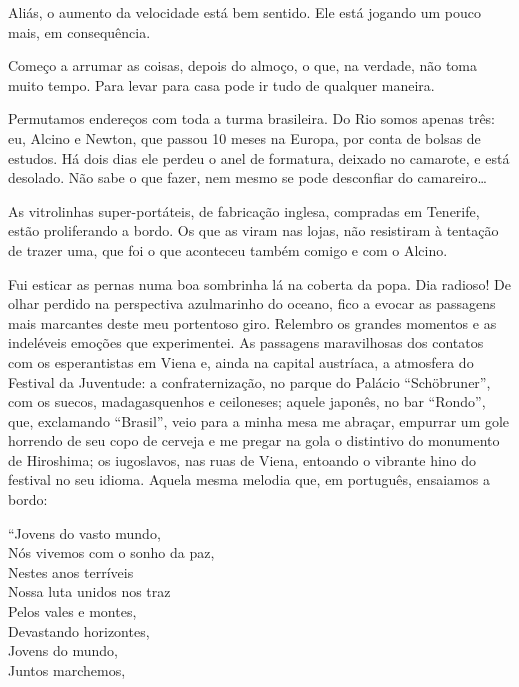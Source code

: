 Aliás, o aumento da velocidade está bem sentido. Ele está jogando um pouco mais, em consequência.

Começo a arrumar as coisas, depois do almoço, o que, na verdade, não toma muito tempo. Para levar para casa pode ir tudo de qualquer maneira.

Permutamos endereços com toda a turma brasileira. Do Rio somos apenas três: eu, Alcino e Newton, que passou 10 meses na Europa, por conta de bolsas de estudos. Há dois dias ele perdeu o anel de formatura, deixado no camarote, e está desolado. Não sabe o que fazer, nem mesmo se pode desconfiar do camareiro\ldots

As vitrolinhas super-portáteis, de fabricação inglesa, compradas em Tenerife, estão proliferando a bordo. Os que as viram nas lojas, não resistiram à tentação de trazer uma, que foi o que aconteceu também comigo e com o Alcino.

Fui esticar as pernas numa boa sombrinha lá na coberta da popa. Dia radioso! De olhar perdido na perspectiva azulmarinho do oceano, fico a evocar as passagens mais marcantes deste meu portentoso giro. Relembro os grandes momentos e as indeléveis emoções que experimentei. As passagens maravilhosas dos contatos com os esperantistas em Viena e, ainda na capital austríaca, a atmosfera do Festival da Juventude: a confraternização, no parque do Palácio “Schöbruner”, com os suecos, madagasquenhos e ceiloneses; aquele japonês, no bar “Rondo”, que, exclamando “Brasil”, veio para a minha mesa me abraçar, empurrar um gole horrendo de seu copo de cerveja e me pregar na gola o distintivo do monumento de Hiroshima; os iugoslavos, nas ruas de Viena, entoando o vibrante hino do festival no seu idioma. Aquela mesma melodia que, em português, ensaiamos a bordo:


“Jovens do vasto mundo,\\

Nós vivemos com o sonho da paz,\\

Nestes anos terríveis\\

Nossa luta unidos nos traz\\

Pelos vales e montes,\\

Devastando horizontes,\\

Jovens do mundo,\\

Juntos marchemos,\\

